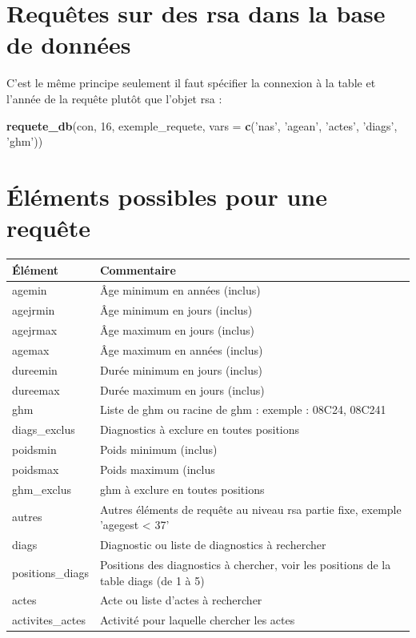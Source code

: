 \documentclass[]{book}
\newenvironment{Shaded}{\begin{snugshade}}{\end{snugshade}}
\newcommand{\KeywordTok}[1]{\textcolor[rgb]{0.13,0.29,0.53}{\textbf{#1}}}
\newcommand{\DataTypeTok}[1]{\textcolor[rgb]{0.13,0.29,0.53}{#1}}
\newcommand{\DecValTok}[1]{\textcolor[rgb]{0.00,0.00,0.81}{#1}}
\newcommand{\StringTok}[1]{\textcolor[rgb]{0.31,0.60,0.02}{#1}}
\newcommand{\NormalTok}[1]{#1}
\theoremstyle{definition}
\theoremstyle{definition}
\theoremstyle{definition}
\theoremstyle{remark}
\begin{document}
\section{Requêtes sur des rsa dans la base de
données}\label{requetes-sur-des-rsa-dans-la-base-de-donnees}

C'est le même principe seulement il faut spécifier la connexion à la
table et l'année de la requête plutôt que l'objet rsa :

\begin{Shaded}
\begin{Highlighting}[]
\KeywordTok{requete_db}\NormalTok{(con, }\DecValTok{16}\NormalTok{, exemple_requete, }\DataTypeTok{vars =} \KeywordTok{c}\NormalTok{(}\StringTok{'nas'}\NormalTok{, }\StringTok{'agean'}\NormalTok{, }\StringTok{'actes'}\NormalTok{, }\StringTok{'diags'}\NormalTok{, }\StringTok{'ghm'}\NormalTok{))}
\end{Highlighting}
\end{Shaded}

\section{Éléments possibles pour une
requête}\label{elements-possibles-pour-une-requete}

\begin{tabular}{l|l}
\hline
Élément & Commentaire\\
\hline
agemin & Âge minimum en années (inclus)\\
\hline
agejrmin & Âge minimum en jours (inclus)\\
\hline
agejrmax & Âge maximum en jours (inclus)\\
\hline
agemax & Âge maximum en années (inclus)\\
\hline
dureemin & Durée minimum en jours (inclus)\\
\hline
dureemax & Durée maximum en jours (inclus)\\
\hline
ghm & Liste de ghm ou racine de ghm : exemple : 08C24, 08C241\\
\hline
diags\_exclus & Diagnostics à exclure en toutes positions\\
\hline
poidsmin & Poids minimum (inclus)\\
\hline
poidsmax & Poids maximum (inclus\\
\hline
ghm\_exclus & ghm à exclure en toutes positions\\
\hline
autres & Autres éléments de requête au niveau rsa partie fixe, exemple 'agegest < 37'\\
\hline
diags & Diagnostic ou liste de diagnostics à rechercher\\
\hline
positions\_diags & Positions des diagnostics à chercher, voir les positions de la table diags (de 1 à 5)\\
\hline
actes & Acte ou liste d'actes à rechercher\\
\hline
activites\_actes & Activité pour laquelle chercher les actes\\
\hline
\end{tabular}
\end{document}
